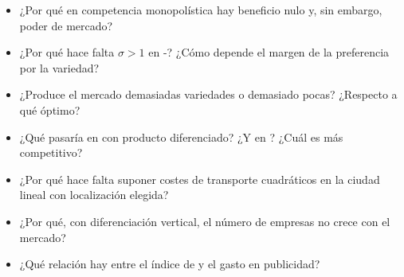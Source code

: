 \documentclass[11pt]{article}
\begin{document}
\begin{itemize}
\item ¿Por qué en competencia monopolística hay beneficio nulo y, sin embargo, poder de mercado?
\item ¿Por qué hace falta $\sigma>1$ en -? ¿Cómo depende el margen de la preferencia por la variedad?
\item ¿Produce el mercado demasiadas variedades o demasiado pocas? ¿Respecto a qué óptimo?
\item ¿Qué pasaría en  con producto diferenciado? ¿Y en ? ¿Cuál es más competitivo?
\item ¿Por qué hace falta suponer costes de transporte cuadráticos en la ciudad lineal con localización elegida?
\item ¿Por qué, con diferenciación vertical, el número de empresas no crece con el mercado?
\item ¿Qué relación hay entre el índice de  y el gasto en publicidad?
\end{itemize}

\bibliografia
\end{document}
